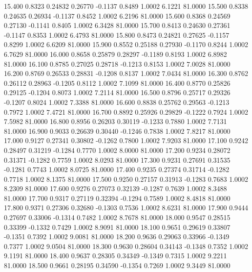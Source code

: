   15.400   0.8323   0.24832   0.26770  -0.1137   0.8489   1.0002   6.1221  81.0000
  15.500   0.8338   0.24635   0.26934  -0.1137   0.8452   1.0002   6.2196  81.0000
  15.600   0.8368   0.24569   0.27130  -0.1141   0.8405   1.0002   6.3428  81.0000
  15.700   0.8413   0.24630   0.27361  -0.1147   0.8353   1.0002   6.4793  81.0000
  15.800   0.8473   0.24821   0.27625  -0.1157   0.8299   1.0002   6.6209  81.0000
  15.900   0.8552   0.25188   0.27930  -0.1170   0.8244   1.0002   6.7629  81.0000
  16.000   0.8658   0.25879   0.28297  -0.1189   0.8193   1.0002   6.8982  81.0000
  16.100   0.8785   0.27025   0.28718  -0.1213   0.8153   1.0002   7.0028  81.0000
  16.200   0.8769   0.26533   0.28831  -0.1208   0.8137   1.0002   7.0434  81.0000
  16.300   0.8762   0.26112   0.28963  -0.1205   0.8112   1.0002   7.1099  81.0000
  16.400   0.8770   0.25826   0.29125  -0.1204   0.8073   1.0002   7.2114  81.0000
  16.500   0.8796   0.25717   0.29326  -0.1207   0.8024   1.0002   7.3388  81.0000
  16.600   0.8838   0.25762   0.29563  -0.1213   0.7972   1.0002   7.4721  81.0000
  16.700   0.8892   0.25926   0.29829  -0.1222   0.7924   1.0002   7.5982  81.0000
  16.800   0.8956   0.26203   0.30119  -0.1233   0.7880   1.0002   7.7131  81.0000
  16.900   0.9033   0.26639   0.30440  -0.1246   0.7838   1.0002   7.8217  81.0000
  17.000   0.9127   0.27341   0.30802  -0.1262   0.7800   1.0002   7.9203  81.0000
  17.100   0.9242   0.28497   0.31219  -0.1284   0.7770   1.0002   8.0000  81.0000
  17.200   0.9234   0.28072   0.31371  -0.1282   0.7759   1.0002   8.0293  81.0000
  17.300   0.9231   0.27691   0.31535  -0.1281   0.7743   1.0002   8.0725  81.0000
  17.400   0.9235   0.27374   0.31714  -0.1282   0.7718   1.0002   8.1375  81.0000
  17.500   0.9250   0.27157   0.31913  -0.1283   0.7683   1.0002   8.2309  81.0000
  17.600   0.9276   0.27073   0.32139  -0.1287   0.7639   1.0002   8.3488  81.0000
  17.700   0.9317   0.27119   0.32394  -0.1294   0.7589   1.0002   8.4818  81.0000
  17.800   0.9371   0.27306   0.32680  -0.1303   0.7536   1.0002   8.6231  81.0000
  17.900   0.9444   0.27697   0.33006  -0.1314   0.7482   1.0002   8.7678  81.0000
  18.000   0.9547   0.28515   0.33399  -0.1332   0.7429   1.0002   8.9091  81.0000
  18.100   0.9651   0.29619   0.33807  -0.1351   0.7392   1.0002   9.0081  81.0000
  18.200   0.9636   0.29063   0.33966  -0.1349   0.7377   1.0002   9.0504  81.0000
  18.300   0.9630   0.28604   0.34143  -0.1348   0.7352   1.0002   9.1191  81.0000
  18.400   0.9637   0.28305   0.34349  -0.1349   0.7315   1.0002   9.2211  81.0000
  18.500   0.9661   0.28195   0.34590  -0.1354   0.7269   1.0002   9.3449  81.0000
